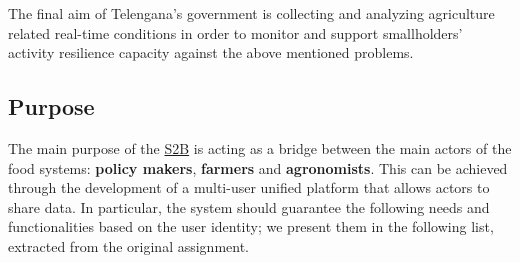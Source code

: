 The final aim of Telengana's government is collecting and analyzing agriculture related real-time conditions in order to monitor and support smallholders' activity resilience capacity against the above mentioned problems.

\subsection{Purpose}
The main purpose of the \hyperref[tab:acronymsTable]{S2B} is acting as a bridge between the main actors of the food systems: \textbf{policy makers}, \textbf{farmers} and \textbf{agronomists}. This can be achieved through the development of a multi-user unified platform that allows actors to share data. In particular, the system should guarantee the following needs and functionalities based on the user identity; we present them in the following list, extracted from the original assignment.
